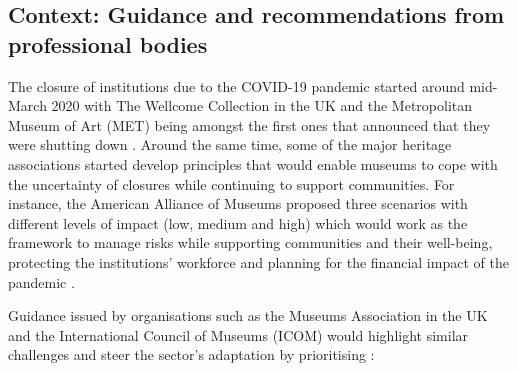 \documentclass{egpubl}
\begin{document}
\subsection{Context: Guidance and recommendations from professional bodies}
\label{con}
The closure of institutions due to the COVID-19 pandemic started around mid-March 2020 with The Wellcome Collection in the UK and the Metropolitan Museum of Art (MET) being amongst the first ones that announced that they were shutting down \cite{McGivern2020,KendallAdams2020}. Around the same time, some of the major heritage  associations started develop principles that would enable museums to cope with the uncertainty of closures while continuing to support communities. For instance, the American Alliance of Museums proposed three scenarios with different levels of impact (low, medium and high) which would work as the framework to manage risks while supporting communities and their well-being, protecting the institutions' workforce and planning for the financial impact of the pandemic \cite{Merritt2020}.

Guidance issued by organisations such as the Museums Association in the UK and the International Council of Museums (ICOM) would highlight similar challenges and steer the sector's adaptation by prioritising \cite{InternationalCouncilofMuseums2020a,Olorunshola2020,MuseumsAssociation2020}:
 
\end{document}
